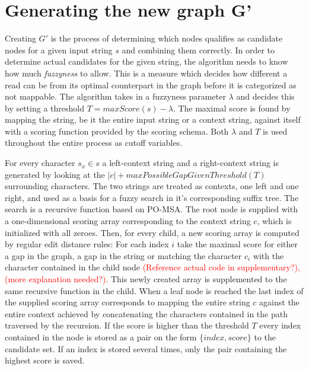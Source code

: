 \documentclass{article}
\begin{document}
\section{Generating the new graph G'}
Creating $G'$ is the process of determining which nodes qualifies as candidate nodes for a given input string $s$ and combining them correctly. In order to determine actual candidates for the given string, the algorithm needs to know how much \textit{fuzzyness} to allow. This is a measure which decides how different a read can be from its optimal counterpart in the graph before it is categorized as not mappable. The algorithm takes in a fuzzyness parameter $\lambda$ and decides this by setting a threshold $T=maxScore(s)-\lambda$. The maximal score is found by mapping the string, be it the entire input string or a context string, against itself with a scoring function provided by the scoring schema. Both $\lambda$ and $T$ is used throughout the entire process as cutoff variables.\\
\par\noindent
For every character $s_x \in s$ a left-context string and a right-context string is generated by looking at the $|c| + maxPossibleGapGivenThreshold(T)$ surrounding characters. The two strings are treated as contexts, one left and one right, and used as a basis for a fuzzy search in it's corresponding suffix tree. The search is a recursive function based on PO-MSA. The root node is supplied with a one-dimensional scoring array corresponding to the context string $c$, which is initialized with all zeroes. Then, for every child, a new scoring array is computed by regular edit distance rules: For each index $i$ take the maximal score for either a gap in the graph, a gap in the string or matching the character $c_i$ with the character contained in the child node \textcolor{red}{(Reference actual code in supplementary?), (more explanation needed?)}. This newly created array is supplemented to the same recursive function in the child. When a leaf node is reached the last index of the supplied scoring array corresponds to mapping the entire string $c$ against the entire context achieved by concatenating the characters contained in the path traversed by the recursion. If the score is higher than the threshold $T$ every index contained in the node is stored as a pair on the form $\{index, score\}$ to the candidate set. If an index is stored several times, only the pair containing the highest score is saved.\\
\par\noindent
\end{document}
